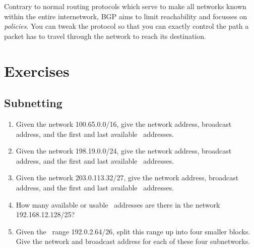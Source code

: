 Contrary to normal routing protocols which serve to make all networks known within the entire internetwork, \acs{BGP} aims to limit reachability and focusses on \emph{policies}.
You can tweak the protocol so that you can exactly control the path a packet has to travel through the network to reach its destination.



\section{Exercises}
\label{sec:ip-exercises}

\subsection{Subnetting}
\begin{enumerate}
\item
   Given the network 100.65.0.0/16, give the network address, broadcast address, and the first and last available \IP\ addresses.
\item
   Given the network 198.19.0.0/24, give the network address, broadcast address, and the first and last available \IP\ addresses.
\item
   Given the network 203.0.113.32/27, give the network address, broadcast address, and the first and last available \IP\ addresses.
\item
   How many available or usable \IP\ addresses are there in the network 192.168.12.128/25?
\item
\label{ex:ip-ospf-ref-bw}
   Given the \IP\ range 192.0.2.64/26, split this range up into four smaller blocks.
   Give the network and broadcast address for each of these four subnetworks.
\end{enumerate}

